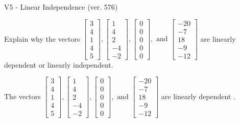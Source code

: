 \begin{exercise}
  \begin{exerciseTitle}V5 - Linear Independence (ver. 576)\end{exerciseTitle}
  \begin{exerciseStatement}
    Explain why the vectors \(\left[\begin{array}{r}
3 \\
4 \\
1 \\
4 \\
5
\end{array}\right] , \left[\begin{array}{r}
1 \\
4 \\
2 \\
-4 \\
-2
\end{array}\right] , \left[\begin{array}{r}
0 \\
0 \\
0 \\
0 \\
0
\end{array}\right] , \text{ and } \left[\begin{array}{r}
-20 \\
-7 \\
18 \\
-9 \\
-12
\end{array}\right]\) are linearly dependent or linearly independent.	


  \end{exerciseStatement}
  \begin{exerciseAnswer}
   The vectors \(\left[\begin{array}{r}
3 \\
4 \\
1 \\
4 \\
5
\end{array}\right] , \left[\begin{array}{r}
1 \\
4 \\
2 \\
-4 \\
-2
\end{array}\right] , \left[\begin{array}{r}
0 \\
0 \\
0 \\
0 \\
0
\end{array}\right] , \text{ and } \left[\begin{array}{r}
-20 \\
-7 \\
18 \\
-9 \\
-12
\end{array}\right]\) are 
  	 linearly dependent  .
  


  \end{exerciseAnswer}
\end{exercise}